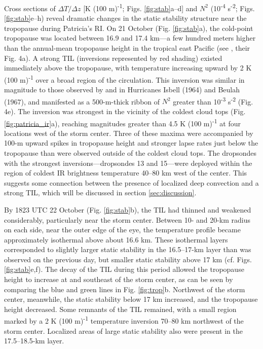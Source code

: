 Cross sections of $\Delta T/\Delta z$ [K (100 m)\textsuperscript{-1}; Figs. \ref{fig:stab}a–d] and $N^2$ (10\textsuperscript{-4} s\textsuperscript{-2}; Figs. \ref{fig:stab}e–h) reveal dramatic changes in the static stability structure near the tropopause during Patricia’s RI.
On 21 October (Fig. \ref{fig:stab}a), the cold-point tropopause was located between 16.9 and 17.4 km---a few hundred meters higher than the annual-mean tropopause height in the tropical east Pacific (see \citeauthor{Seideletal2001} \citeyear{Seideletal2001}, their Fig. 4a).
A strong TIL (inversions represented by red shading) existed immediately above the tropopause, with temperature increasing upward by 2 K (100 m)\textsuperscript{-1} over a broad region of the circulation.
This inversion was similar in magnitude to those observed by \cite{Gentry1967} and \cite{Waco1970} in Hurricanes Isbell (1964) and Beulah (1967), and manifested as a 500-m-thick ribbon of $N^2$ greater than 10\textsuperscript{-3} s\textsuperscript{-2} (Fig. 4e).
The inversion was strongest in the vicinity of the coldest cloud tops (Fig. \ref{fig:patricia_ir}a), reaching magnitudes greater than 4.5 K (100 m)\textsuperscript{-1} at four locations west of the storm center.
Three of these maxima were accompanied by 100-m upward spikes in tropopause height and stronger lapse rates just below the tropopause than were observed outside of the coldest cloud tops.
The dropsondes with the strongest inversions---dropsondes 13 and 15---were deployed within the region of coldest IR brightness temperature 40–80 km west of the center.
This suggests some connection between the presence of localized deep convection and a strong TIL, which will be discussed in section \ref{sec:discussion}.

By 1823 UTC 22 October (Fig. \ref{fig:stab}b), the TIL had thinned and weakened considerably, particularly near the storm center.
Between 10- and 20-km radius on each side, near the outer edge of the eye, the temperature profile became approximately isothermal above about 16.6 km.
These isothermal layers corresponded to slightly larger static stability in the 16.5–17-km layer than was observed on the previous day, but smaller static stability above 17 km (cf. Figs. \ref{fig:stab}e,f).
The decay of the TIL during this period allowed the tropopause height to increase at and southeast of the storm center, as can be seen by comparing the blue and green lines in Fig. \ref{fig:trop}b.
Northwest of the storm center, meanwhile, the static stability below 17 km increased, and the tropopause height decreased. Some remnants of the TIL remained, with a small region marked by a 2 K (100 m)\textsuperscript{-1} temperature inversion 70–80 km northwest of the storm center.
Localized areas of large static stability also were present in the 17.5–18.5-km layer.

